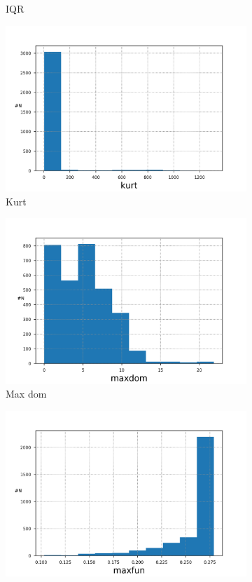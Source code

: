 \documentclass{article}
\begin{document}
\begin{figure}[H]
\begin{subfigure}{.5\textwidth}
                \caption{IQR}
            \end{subfigure}
            \begin{subfigure}{.5\textwidth}
                \centering
                \includegraphics[width=.8\linewidth]{img1/data_histkurt.png}
                \caption{Kurt}
            \end{subfigure}
            \begin{subfigure}{.5\textwidth}
                \centering
                \includegraphics[width=.8\linewidth]{img1/data_histmaxdom.png}
                \caption{Max dom}
            \end{subfigure}
            \begin{subfigure}{.5\textwidth}
                \centering
                \includegraphics[width=.8\linewidth]{img1/data_histmaxfun.png}

\end{subfigure}
\end{figure}
\end{document}
